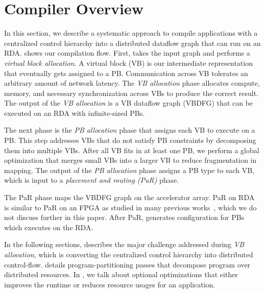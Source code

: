 
\section{Compiler Overview}
In this section, we describe a systematic approach to compile applications with a centralized control hierarchy 
into a distributed dataflow graph that can run on an RDA.
 shows our compilation flow.
First, \name{} takes the input graph and performs a {\em virtual block allocation}.
A virtual block (VB) is our intermediate representation that eventually gets assigned to a PB.
Communication across VB tolerates an arbitrary amount of network latency.
The {\em VB allocation} phase allocates compute, memory, and necessary synchronization across VBs to produce the correct result.
The output of the {\em VB allocation} is a VB dataflow graph (VBDFG) that can be executed on an RDA with infinite-sized PBs.

The next phase is the {\em PB allocation} phase that assigns each VB to execute on a PB. 
This step addresses VBs that do not satisfy PB constraints by decomposing them into multiple VBs.
After all VB fits in at least one PB, we perform a global optimization that merges 
small VBs into a larger VB to reduce fragmentation in mapping.
The output of the {\em PB allocation} phase assigns a PB type to each VB, which is input to a {\em placement and routing (PaR)} phase.

The PaR phase maps the VBDFG graph on the accelerator array.
PaR on RDA is similar to PaR on an FPGA as studied in many previous works~\cite{network}, which we do not discuss further in this paper. 
After PaR, \name{} generates configuration for PBs which executes on the RDA.

In the following sections,  describes the major challenge addressed during {\em VB allocation}, which is converting the centralized control hierarchy into distributed control-flow.
 details program-partitioning passes that decompose program over distributed resources.
In , we talk about optional optimizations that either improves the runtime or reduces resource usages for an application.

